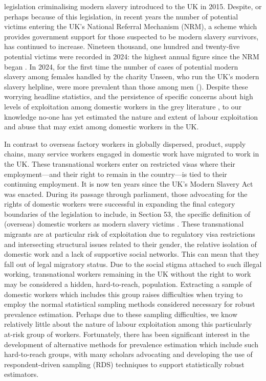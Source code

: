 \documentclass[
  12pt,
  letterpaper,
  DIV=11,
  numbers=noendperiod]{scrartcl}
\theoremstyle{plain}
\theoremstyle{definition}
\begin{document}
legislation criminalising modern slavery introduced to the UK in 2015.
Despite, or perhaps because of this legislation, in recent years the
number of potential victims entering the UK's National Referral
Mechanism (NRM), a scheme which provides government support for those
suspected to be modern slavery survivors, has continued to increase.
Nineteen thousand, one hundred and twenty-five potential victims were
recorded in 2024: the highest annual figure since the NRM began
\autocite{home_office_modern_2025}. In 2024, for the
first time the number of cases of potential modern slavery among females
handled by the charity Unseen, who run the UK's modern slavery helpline,
were more prevalent than those among men 
(\cite{carter_women_2025}). Despite these worrying
headline statistics, and the persistence of specific concerns about high
levels of exploitation among domestic workers in the grey literature
\autocite{kalayaan_new_2008, mantouvalou_modern_2016, latin_american_womens_rights_service_behind_2023}, to our knowledge no-one has yet estimated the nature and extent of labour exploitation and abuse that may exist among domestic workers in the UK.

In contrast to overseas factory workers in globally dispersed, product,
supply chains, many service workers engaged in domestic work have
migrated to work in the UK. These transnational workers enter on
restricted visas where their employment---and their right to remain in
the country---is tied to their continuing employment. It is now ten
years since the UK's Modern Slavery Act was enacted. During its passage
through parliament, those advocating for the rights of domestic workers
were successful in expanding the final category boundaries of the
legislation to include, in Section 53, the specific definition of
(overseas) domestic workers as modern slavery victims 
\autocite{caruana_boundaries_2025}. These transnational
migrants are at particular risk of exploitation due to regulatory visa
restrictions and intersecting structural issues related to their gender,
the relative isolation of domestic work and a lack of supportive social
networks. This can mean that they fall out of legal migratory status.
Due to the social stigma attached to such illegal working, transnational
workers remaining in the UK without the right to work may be considered
a hidden, hard-to-reach, population. Extracting a sample of domestic
workers which includes this group raises difficulties when trying to
employ the normal statistical sampling methods considered necessary for
robust prevalence estimation. Perhaps due to these sampling
difficulties, we know relatively little about the nature of labour
exploitation among this particularly at-risk group of workers.
Fortunately, there has been significant interest in the development of
alternative methods for prevalence estimation which include such
hard-to-reach groups, with many scholars advocating and developing the
use of respondent-driven sampling (RDS) techniques to support
statistically robust estimators.
\end{document}
